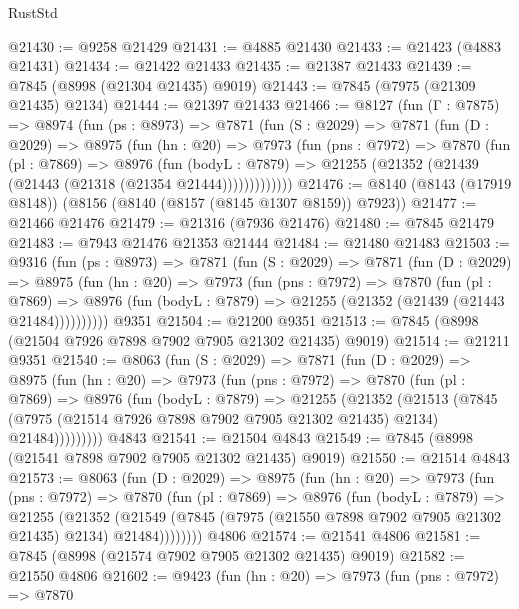 \begin{lexlean}{RustStd}
\begin{coremodule}
@21430 := @9258 @21429
@21431 := @4885 @21430
@21433 := @21423 (@4883 @21431)
@21434 := @21422 @21433
@21435 := @21387 @21433
@21439 := @7845 (@8998 (@21304 @21435) @9019)
@21443 := @7845 (@7975 (@21309 @21435) @2134)
@21444 := @21397 @21433
@21466 := @8127
    (fun (Γ : @7875) =>
    @8974
      (fun (ps : @8973) =>
      @7871
        (fun (S : @2029) =>
        @7871
          (fun (D : @2029) =>
          @8975
            (fun (hn : @20) =>
            @7973
              (fun (pns : @7972) =>
              @7870
                (fun (pl : @7869) =>
                @8976
                  (fun (bodyL : @7879) =>
                  @21255 (@21352 (@21439 (@21443 (@21318 (@21354 @21444)))))))))))))
@21476 := @8140 (@8143 (@17919 @8148)) (@8156 (@8140 (@8157 (@8145 @1307 @8159)) @7923))
@21477 := @21466 @21476
@21479 := @21316 (@7936 @21476)
@21480 := @7845 @21479
@21483 := @7943 @21476 @21353 @21444
@21484 := @21480 @21483
@21503 := @9316
    (fun (ps : @8973) =>
    @7871
      (fun (S : @2029) =>
      @7871
        (fun (D : @2029) =>
        @8975
          (fun (hn : @20) =>
          @7973
            (fun (pns : @7972) =>
            @7870
              (fun (pl : @7869) =>
              @8976 (fun (bodyL : @7879) => @21255 (@21352 (@21439 (@21443 @21484))))))))))
    @9351
@21504 := @21200 @9351
@21513 := @7845 (@8998 (@21504 @7926 @7898 @7902 @7905 @21302 @21435) @9019)
@21514 := @21211 @9351
@21540 := @8063
    (fun (S : @2029) =>
    @7871
      (fun (D : @2029) =>
      @8975
        (fun (hn : @20) =>
        @7973
          (fun (pns : @7972) =>
          @7870
            (fun (pl : @7869) =>
            @8976
              (fun (bodyL : @7879) =>
              @21255
                (@21352
                  (@21513
                    (@7845
                      (@7975 (@21514 @7926 @7898 @7902 @7905 @21302 @21435) @2134)
                      @21484)))))))))
    @4843
@21541 := @21504 @4843
@21549 := @7845 (@8998 (@21541 @7898 @7902 @7905 @21302 @21435) @9019)
@21550 := @21514 @4843
@21573 := @8063
    (fun (D : @2029) =>
    @8975
      (fun (hn : @20) =>
      @7973
        (fun (pns : @7972) =>
        @7870
          (fun (pl : @7869) =>
          @8976
            (fun (bodyL : @7879) =>
            @21255
              (@21352
                (@21549 (@7845 (@7975 (@21550 @7898 @7902 @7905 @21302 @21435) @2134) @21484))))))))
    @4806
@21574 := @21541 @4806
@21581 := @7845 (@8998 (@21574 @7902 @7905 @21302 @21435) @9019)
@21582 := @21550 @4806
@21602 := @9423
    (fun (hn : @20) =>
    @7973
      (fun (pns : @7972) =>
      @7870

\end{coremodule}
\end{lexlean}

